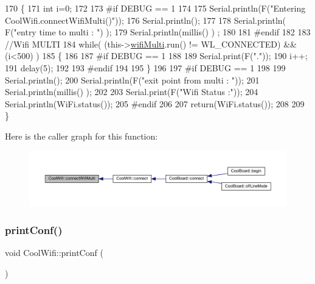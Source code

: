 \begin{DoxyCode}
170 \{
171     \textcolor{keywordtype}{int} i=0;
172 
173 \textcolor{preprocessor}{#if DEBUG == 1 }
174 
175     Serial.println(F(\textcolor{stringliteral}{"Entering CoolWifi.connectWifiMulti()"}));
176     Serial.println();
177     
178     Serial.println( F(\textcolor{stringliteral}{"entry time to multi : "}) );
179     Serial.println(millis() ) ;
180 
181 \textcolor{preprocessor}{#endif}
182     
183     \textcolor{comment}{//Wifi MULTI}
184     \textcolor{keywordflow}{while}( (this->\hyperlink{classCoolWifi_a7862a8c0d7239877e2956c14a368aab8}{wifiMulti}.run() != WL\_CONNECTED) && (i<500)  ) 
185     \{
186 
187 \textcolor{preprocessor}{    #if DEBUG == 1}
188 
189         Serial.print(F(\textcolor{stringliteral}{"."}));
190         i++;
191         delay(5);
192 
193 \textcolor{preprocessor}{    #endif}
194 
195         \}   
196 
197 \textcolor{preprocessor}{#if DEBUG == 1 }
198 
199     Serial.println();   
200     Serial.println(F(\textcolor{stringliteral}{"exit point from multi : "}));
201     Serial.println(millis() );
202     
203     Serial.print(F(\textcolor{stringliteral}{"Wifi Status :"}));
204     Serial.println(WiFi.status());
205 \textcolor{preprocessor}{#endif}
206 
207     \textcolor{keywordflow}{return}(WiFi.status());
208 
209 \}
\end{DoxyCode}
Here is the caller graph for this function\+:\nopagebreak
\begin{figure}[H]
\begin{center}
\leavevmode
\includegraphics[width=350pt]{classCoolWifi_a419de92d738f14b7444cf822b3ab0070_icgraph}
\end{center}
\end{figure}
\mbox{\label{classCoolWifi_a9e6105c6d13d35ec510f6633da9e0223}} 
\subsubsection{\texorpdfstring{print\+Conf()}{printConf()}}
{\footnotesize\ttfamily void Cool\+Wifi\+::print\+Conf (\begin{DoxyParamCaption}{ }\end{DoxyParamCaption})}

